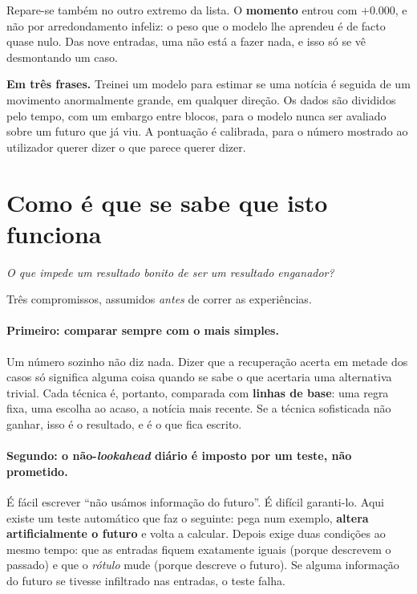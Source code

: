 Repare-se também no outro extremo da lista. O \textbf{momento} entrou com $+0.000$, e não por
arredondamento infeliz: o peso que o modelo lhe aprendeu é de facto quase nulo. Das nove entradas,
uma não está a fazer nada, e isso só se vê desmontando um caso.

\begin{tcolorbox}[colback=black!3, colframe=black!30, boxrule=0.4pt, arc=2pt]
\textbf{Em três frases.} Treinei um modelo para estimar se uma notícia é seguida de um movimento
anormalmente grande, em qualquer direção. Os dados são divididos pelo tempo, com um embargo entre
blocos, para o modelo nunca ser avaliado sobre um futuro que já viu. A pontuação é calibrada, para o
número mostrado ao utilizador querer dizer o que parece querer dizer.
\end{tcolorbox}

\section{Como é que se sabe que isto funciona}
\label{sec:met_avaliacao}

\emph{O que impede um resultado bonito de ser um resultado enganador?}

Três compromissos, assumidos \emph{antes} de correr as experiências.

\paragraph{Primeiro: comparar sempre com o mais simples.}
Um número sozinho não diz nada. Dizer que a recuperação acerta em metade dos casos só significa
alguma coisa quando se sabe o que acertaria uma alternativa trivial. Cada técnica é, portanto,
comparada com \textbf{linhas de base}: uma regra fixa, uma escolha ao acaso, a notícia mais
recente. Se a técnica sofisticada não ganhar, isso é o resultado, e é o que fica escrito.

\paragraph{Segundo: o não-\emph{lookahead} diário é imposto por um teste, não prometido.}
É fácil escrever ``não usámos informação do futuro''. É difícil garanti-lo. Aqui existe um teste
automático que faz o seguinte: pega num exemplo, \textbf{altera artificialmente o futuro} e volta a
calcular. Depois exige duas condições ao mesmo tempo: que as entradas fiquem exatamente
iguais (porque descrevem o passado) e que o \emph{rótulo} mude (porque descreve o futuro). Se
alguma informação do futuro se tivesse infiltrado nas entradas, o teste falha.


